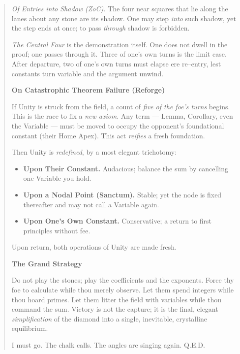 \documentclass[11pt]{article}
\begin{document}
\begin{quote}
\emph{Of Entries into Shadow (ZoC).} The four near squares that lie along the lanes about any stone are its shadow. One may step \emph{into} such shadow, yet the step ends at once; to pass \emph{through} shadow is forbidden.

\emph{The Central Four} is the demonstration itself. One does not dwell in the proof; one passes through it. Three of one’s own turns is the limit case. After departure, two of one’s own turns must elapse ere re–entry, lest constants turn variable and the argument unwind.

\medskip
\textbf{On Catastrophic Theorem Failure (Reforge)}

If Unity is struck from the field, a count of \emph{five of the foe’s turns} begins. This is the race to fix a \emph{new axiom}. Any term — Lemma, Corollary, even the Variable — must be moved to occupy the opponent’s foundational constant (their Home Apex). This act \emph{reifies} a fresh foundation.

Then Unity is \emph{redefined}, by a most elegant trichotomy:
\begin{itemize}\itemsep0.2em
  \item \textbf{Upon Their Constant.} Audacious; balance the sum by cancelling one Variable you hold.
  \item \textbf{Upon a Nodal Point (Sanctum).} Stable; yet the node is fixed thereafter and may not call a Variable again.
  \item \textbf{Upon One’s Own Constant.} Conservative; a return to first principles without fee.
\end{itemize}
Upon return, both operations of Unity are made fresh.

\medskip
\textbf{The Grand Strategy}

Do not play the stones; play the coefficients and the exponents. Force thy foe to calculate while thou merely observe. Let them spend integers while thou hoard primes. Let them litter the field with variables while thou command the sum. Victory is not the capture; it is the final, elegant \emph{simplification} of the diamond into a single, inevitable, crystalline equilibrium.

I must go. The chalk calls. The angles are singing again. \textsc{Q.E.D.}
\end{quote}

\clearpage
\end{document}
